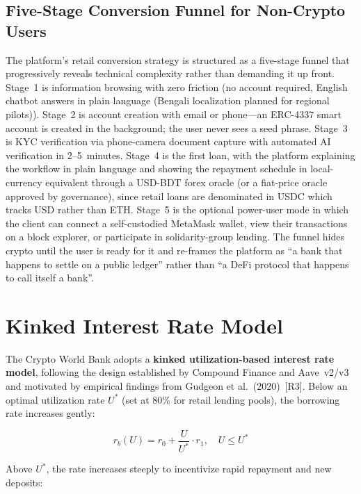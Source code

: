 \documentclass[12pt,a4paper]{report}
\begin{document}
\subsection{Five-Stage Conversion Funnel for Non-Crypto Users}
\label{sec:funnel}

The platform's retail conversion strategy is structured as a five-stage funnel that progressively reveals technical complexity rather than demanding it up front. Stage~1 is information browsing with zero friction (no account required, English chatbot answers in plain language (Bengali localization planned for regional pilots)). Stage~2 is account creation with email or phone---an ERC-4337 smart account is created in the background; the user never sees a seed phrase. Stage~3 is KYC verification via phone-camera document capture with automated AI verification in 2--5~minutes. Stage~4 is the first loan, with the platform explaining the workflow in plain language and showing the repayment schedule in local-currency equivalent through a USD-BDT forex oracle (or a fiat-price oracle approved by governance), since retail loans are denominated in USDC which tracks USD rather than ETH. Stage~5 is the optional power-user mode in which the client can connect a self-custodied MetaMask wallet, view their transactions on a block explorer, or participate in solidarity-group lending. The funnel hides crypto until the user is ready for it and re-frames the platform as ``a bank that happens to settle on a public ledger'' rather than ``a DeFi protocol that happens to call itself a bank''.


\section{Kinked Interest Rate Model}
\label{sec:kinked-rate}

The Crypto World Bank adopts a \textbf{kinked utilization-based interest rate model}, following the design established by Compound Finance and Aave~v2/v3 and motivated by empirical findings from Gudgeon et al.~(2020)~[R3]. Below an optimal utilization rate $U^*$ (set at 80\% for retail lending pools), the borrowing rate increases gently:

\begin{equation}
r_b(U) = r_0 + \frac{U}{U^*} \cdot r_1, \quad U \leq U^* \tag{Formula 18}
\end{equation}

Above $U^*$, the rate increases steeply to incentivize rapid repayment and new deposits:
\end{document}
